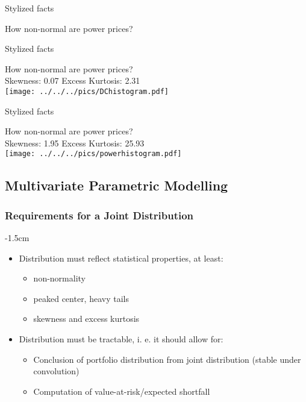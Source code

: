{Stylized facts}
\begin{center}
How non-normal are power prices?\\
\end{center}


{Stylized facts}
\begin{center}
How non-normal are power prices?\\
Skewness: 0.07 \hspace{2cm} Excess Kurtosis: 2.31\\
\texttt{[image: ../../../pics/DChistogram.pdf]}
\end{center}


{Stylized facts} %
\begin{center}
How non-normal are power prices?\\
Skewness: 1.95 \hspace{2cm} Excess Kurtosis: 25.93\\
\texttt{[image: ../../../pics/powerhistogram.pdf]}
\end{center}






\subsection{Multivariate Parametric Modelling}
\subsubsection{Requirements for a Joint Distribution}

{-1.5cm}
\begin{itemize}
\item Distribution must reflect statistical properties, at least:
    \begin{itemize}
    \item non-normality
    \item peaked center, heavy tails
    \item skewness and excess kurtosis
    \end{itemize}
\item Distribution must be tractable, i. e. it should allow for:
    \begin{itemize}
    \item Conclusion of portfolio distribution from joint distribution (stable under convolution)
    \item Computation of value-at-risk/expected shortfall
    \end{itemize}
\end{itemize}



